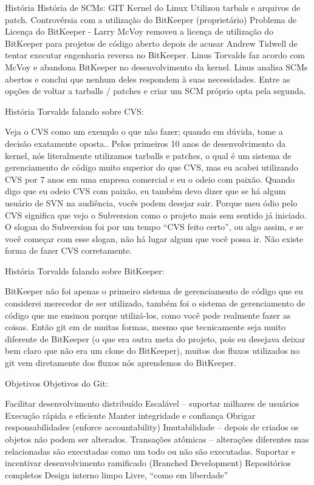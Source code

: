 \documentclass{beamer}
\begin{document}
História
História de SCMs:
GIT
Kernel do Linux
Utilizou tarbals e arquivos de patch.
Controvérsia com a utilização do BitKeeper (proprietário)
Problema de Licença do BitKeeper - Larry McVoy removeu a licença de utilização do
BitKeeper para projetos de código aberto depois de acusar Andrew Tidwell de tentar
executar engenharia reversa no BitKeeper.
Linus Torvalds faz acordo com McVoy e abandona BitKeeper no desenvolvimento da
kernel.
Linus
analisa SCMs abertos e conclui que nenhum deles respondem à suas
necessidades. Entre as opções de voltar a tarballs / patches e criar um SCM próprio
opta pela segunda.

História
Torvalds falando sobre CVS:

Veja o CVS como um exemplo o que não fazer; quando em dúvida, tome a
decisão exatamente oposta..
Pelos primeiros 10 anos de desenvolvimento da kernel, nós literalmente
utilizamos tarballs e patches, o qual é um sistema de gerenciamento de código
muito superior do que CVS, mas eu acabei utilizando CVS por 7 anos em uma
empresa comercial e eu o odeio com paixão. Quando digo que eu odeio CVS
com paixão, eu também devo dizer que se há algum usuário de SVN na
audiência, vocês podem desejar sair. Porque meu ódio pelo CVS significa que
vejo o Subversion como o projeto mais sem sentido já iniciado. O slogan do
Subversion foi por um tempo “CVS feito certo”, ou algo assim, e se você começar
com esse slogan, não há lugar algum que você possa ir. Não existe forma de
fazer CVS corretamente.

História
Torvalds falando sobre BitKeeper:

BitKeeper não foi apenas o primeiro sistema de gerenciamento de código que eu
considerei merecedor de ser utilizado, também foi o sistema de gerenciamento
de código que me ensinou porque utilizá-los, como você pode realmente fazer as
coisas. Então git em de muitas formas, mesmo que tecnicamente seja muito
diferente de BitKeeper (o que era outra meta do projeto, pois eu desejava deixar
bem claro que não era um clone do BitKeeper), muitos dos fluxos utilizados no
git vem diretamente dos fluxos nós aprendemos do BitKeeper.

Objetivos
Objetivos do Git:

Facilitar desenvolvimento distribuído
Escalável – suportar milhares de usuários
Execução rápida e eficiente
Manter integridade e confiança
Obrigar responsabilidades (enforce accountability)
Imutabilidade – depois de criados os objetos não podem ser
alterados.
Transações atômicas – alterações diferentes mas relacionadas
são executadas como um todo ou não são executadas.
Suportar e incentivar desenvolvimento ramificado (Branched
Development)
Repositórios completos
Design interno limpo
Livre, “como em liberdade”
\end{document}

